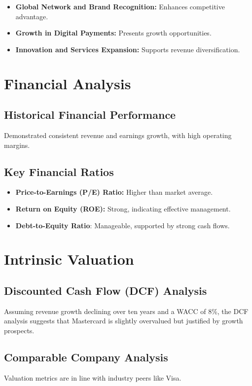 \documentclass[12pt]{report}
\begin{document}
\begin{itemize}
    \item \textbf{Global Network and Brand Recognition:} Enhances competitive advantage.
    \item \textbf{Growth in Digital Payments:} Presents growth opportunities.
    \item \textbf{Innovation and Services Expansion:} Supports revenue diversification.
\end{itemize}

\section{Financial Analysis}
\subsection{Historical Financial Performance}
Demonstrated consistent revenue and earnings growth, with high operating margins.

\subsection{Key Financial Ratios}
\begin{itemize}
    \item \textbf{Price-to-Earnings (P/E) Ratio:} Higher than market average.
    \item \textbf{Return on Equity (ROE):} Strong, indicating effective management.
    \item \textbf{Debt-to-Equity Ratio}: Manageable, supported by strong cash flows.
\end{itemize}

\section{Intrinsic Valuation}
\subsection{Discounted Cash Flow (DCF) Analysis}
Assuming revenue growth declining over ten years and a WACC of 8\%, the DCF analysis suggests that Mastercard is slightly overvalued but justified by growth prospects.

\subsection{Comparable Company Analysis}
Valuation metrics are in line with industry peers like Visa.
\end{document}
